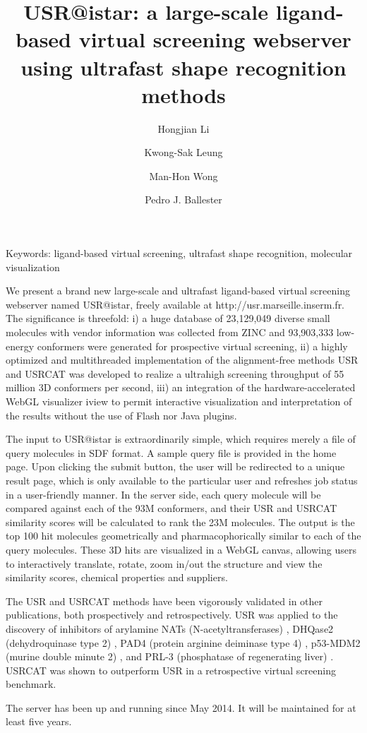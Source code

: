 \documentclass[a4paper,10pt]{article}
\title{USR@istar: a large-scale ligand-based virtual screening webserver using ultrafast shape recognition methods}
\author[1]{Hongjian Li}
\author[1]{Kwong-Sak Leung}
\author[1]{Man-Hon Wong}
\author[2]{Pedro J. Ballester}
\affil[1]{Department of Computer Science and Engineering, Chinese University of Hong Kong.}
\affil[ ]{\{hjli,ksleung,mhwong\}@cse.cuhk.edu.hk}
\affil[2]{Cancer Research Center of Marseille, INSERM U1068; Institut Paoli-Calmettes; Aix-Marseille Universit\'{e}; CNRS UMR7258, Marseille, France.}
\affil[ ]{pedro.ballester@inserm.fr}
\begin{document}
\date{}
\maketitle
\thispagestyle{title}
\noindent Keywords: ligand-based virtual screening, ultrafast shape recognition, molecular visualization

We present a brand new large-scale and ultrafast ligand-based virtual screening webserver named USR@istar, freely available at http://usr.marseille.inserm.fr. The significance is threefold: i) a huge database of 23,129,049 diverse small molecules with vendor information was collected from ZINC \cite{532,1178} and 93,903,333 low-energy conformers were generated for prospective virtual screening, ii) a highly optimized and multithreaded implementation of the alignment-free methods USR \cite{1379} and USRCAT \cite{1331} was developed to realize a ultrahigh screening throughput of 55 million 3D conformers per second, iii) an integration of the hardware-accelerated WebGL visualizer iview \cite{1366} to permit interactive visualization and interpretation of the results without the use of Flash nor Java plugins.

The input to USR@istar is extraordinarily simple, which requires merely a file of query molecules in SDF format. A sample query file is provided in the home page. Upon clicking the submit button, the user will be redirected to a unique result page, which is only available to the particular user and refreshes job status in a user-friendly manner. In the server side, each query molecule will be compared against each of the 93M conformers, and their USR \cite{1379} and USRCAT \cite{1331} similarity scores will be calculated to rank the 23M molecules. The output is the top 100 hit molecules geometrically and pharmacophorically similar to each of the query molecules. These 3D hits are visualized in a WebGL canvas, allowing users to interactively translate, rotate, zoom in/out the structure and view the similarity scores, chemical properties and suppliers.

The USR \cite{1379} and USRCAT \cite{1331} methods have been vigorously validated in other publications, both prospectively and retrospectively. USR \cite{1379} was applied to the discovery of inhibitors of arylamine NATs (N-acetyltransferases) \cite{1380}, DHQase2 (dehydroquinase type 2) \cite{1281}, PAD4 (protein arginine deiminase type 4) \cite{1504}, p53-MDM2 (murine double minute 2) \cite{1502}, and PRL-3 (phosphatase of regenerating liver) \cite{1615}. USRCAT \cite{1331} was shown to outperform USR in a retrospective virtual screening benchmark.

The server has been up and running since May 2014. It will be maintained for at least five years.

\linespread{0.5}
\tiny


\end{document}
